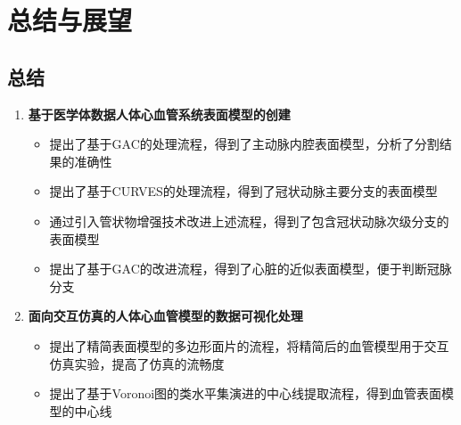 \section{总结与展望}

\subsection{总结}
\begin{frame}
\begin{enumerate}
\item \textbf{基于医学体数据人体心血管系统表面模型的创建}
\begin{itemize}
\pause \item 提出了基于GAC的处理流程，得到了主动脉内腔表面模型，分析了分割结果的准确性
\pause \item 提出了基于CURVES的处理流程，得到了冠状动脉主要分支的表面模型
\pause \item 通过引入管状物增强技术改进上述流程，得到了包含冠状动脉次级分支的表面模型
\pause \item 提出了基于GAC的改进流程，得到了心脏的近似表面模型，便于判断冠脉分支
\end{itemize}
\pause \item \textbf{面向交互仿真的人体心血管模型的数据可视化处理}
\begin{itemize}
\pause \item 提出了精简表面模型的多边形面片的流程，将精简后的血管模型用于交互仿真实验，提高了仿真的流畅度
\pause \item 提出了基于Voronoi图的类水平集演进的中心线提取流程，得到血管表面模型的中心线
\end{itemize}
\end{enumerate}
\end{frame}

